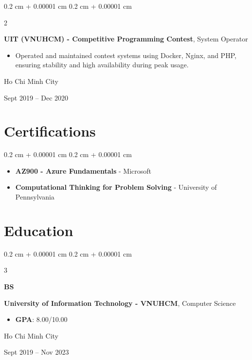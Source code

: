 \documentclass[10pt, a4paper]{article}
\newenvironment{highlights}{
    \begin{itemize}[
        topsep=0.12 cm,
        parsep=0.10 cm,
        partopsep=0pt,
        itemsep=0pt,
        leftmargin=0.4 cm + 10pt
    ]
}{
    \end{itemize}
} %
\newenvironment{highlightsforbulletentries}{
    \begin{itemize}[
        topsep=0.12 cm,
        parsep=0.10 cm,
        partopsep=0pt,
        itemsep=0pt,
        leftmargin=10pt
    ]
}{
    \end{itemize}
} %
\newenvironment{onecolentry}{
    \begin{adjustwidth}{
        0.2 cm + 0.00001 cm
    }{
        0.2 cm + 0.00001 cm
    }
}{
    \end{adjustwidth}
} %
\newenvironment{twocolentry}[2][]{
    \onecolentry
    \def\secondColumn{#2}
    \setcolumnwidth{\fill, 4.5 cm}
    \begin{paracol}{2}
}{
    \switchcolumn \raggedleft \secondColumn
    \end{paracol}
    \endonecolentry
} %
\newenvironment{threecolentry}[3][]{
    \onecolentry
    \def\thirdColumn{#3}
    \setcolumnwidth{1 cm, \fill, 4.5 cm}
    \begin{paracol}{3}
    {\raggedright #2} \switchcolumn
}{
    \switchcolumn \raggedleft \thirdColumn
    \end{paracol}
    \endonecolentry
} %
\begin{document}
        \vspace{0.2 cm}

        \begin{twocolentry}{
            Ho Chi Minh City

        Sept 2019 – Dec 2020
        }
            \textbf{UIT (VNUHCM) - Competitive Programming Contest}, System Operator
            \begin{highlights}
                \item Operated and maintained contest systems using Docker, Nginx, and PHP, ensuring stability and high availability during peak usage.
            \end{highlights}
        \end{twocolentry}



    
    \section{Certifications}

    \begin{onecolentry}
        \begin{highlightsforbulletentries}


        \item \textbf{AZ900 - Azure Fundamentals} - Microsoft

        \item \textbf{Computational Thinking for Problem Solving} - University of Pennsylvania


        \end{highlightsforbulletentries}
    \end{onecolentry}

    \section{Education}



        
        \begin{threecolentry}{\textbf{BS}}{
            Ho Chi Minh City

        Sept 2019 – Nov 2023
        }
            \textbf{University of Information Technology - VNUHCM}, Computer Science
            \begin{highlights}
                \item \textbf{GPA}: 8.00/10.00
            \end{highlights}
        \end{threecolentry}
\end{document}
